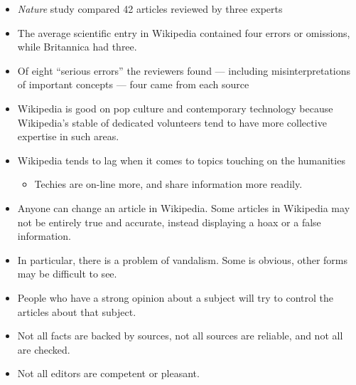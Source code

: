 \documentclass[a4paper,landscape,headrule,footrule,xetex]{foils}
\begin{document}




\begin{itemize}
\item \textit{Nature} study compared 42 articles reviewed by three experts

\item The average scientific entry in Wikipedia contained four errors
  or omissions, while Britannica had three.
\item Of eight ``serious errors'' the reviewers found — including misinterpretations of important concepts — four came from each source
\item Wikipedia is good on pop culture and contemporary technology
  because Wikipedia's stable of dedicated volunteers tend to have more
  collective expertise in such areas.
\item Wikipedia  tends to lag when it comes to topics touching on the humanities 
  \begin{itemize}
  \item Techies are on-line more, and share information more readily.
  \end{itemize}
\end{itemize}

\begin{itemize}
\item Anyone can change an article in Wikipedia. Some articles in
  Wikipedia may not be entirely true and accurate, instead displaying
  a hoax or a false information.
\item In particular, there is a problem of vandalism. Some  is obvious,
  other forms  may be difficult to see.
\item People who have a strong opinion about a subject will try to
  control the articles about that subject.
\item Not all facts are backed by sources, not all sources are
  reliable, and not all are checked.
\item Not all editors are competent or pleasant. 
\end{itemize}
\end{document}

